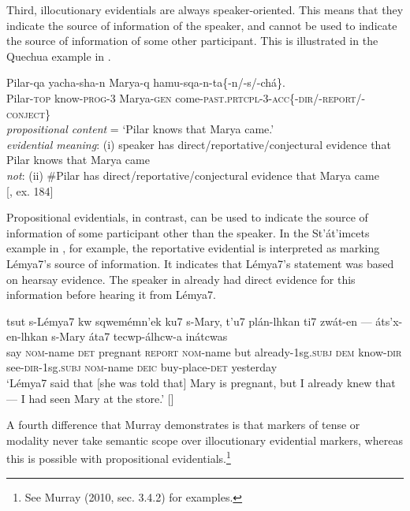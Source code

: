 Third, illocutionary evidentials are always speaker-oriented. This means that they indicate the source of information of the speaker, and cannot be used to indicate the source of information of some other participant. This is illustrated in the Quechua example in .


\ea
\gll Pilar-qa  yacha-sha-n  Marya-q  hamu-sqa-n-ta\{-n/-s/-chá\}.\\
Pilar-\textsc{top}  know-\textsc{prog}-3  Marya-\textsc{gen}  come-\textsc{past.prtcpl}-3-\textsc{acc\{-dir}/-\textsc{report}/-\textsc{conject\}}\\
\glt \textit{propositional content} = ‘Pilar knows that Marya came.’\\
\textit{evidential meaning}: (i) speaker has direct/reportative/conjectural evidence that\\
    Pilar knows that Marya came\\
\textit{not}: (ii) \#Pilar has direct/reportative/conjectural evidence that Marya came\\
     {}[\citealt{Faller2002}, ex. 184]
\z


Propositional evidentials, in contrast, can be used to indicate the source of information of some participant other than the speaker. In the St’át’imcets example in , for example, the reportative evidential is interpreted as marking Lémya7’s source of information. It indicates that Lémya7’s statement was based on hearsay evidence. The speaker in  already had direct evidence for this information before hearing it from Lémya7.


\ea
\gll tsut  s-Lémya7  kw  sqwemémn’ek  ku7  s-Mary,  t’u7  plán-lhkan ti7  zwát-en  —  áts’x-en-lhkan  s-Mary  áta7  tecwp-álhcw-a  inátcwas\\
say  \textsc{nom}-name  \textsc{det}  pregnant  \textsc{report  nom}-name  but  already-1sg.\textsc{subj} \textsc{dem}  know-\textsc{dir}    see-\textsc{dir}-1sg.\textsc{subj}  \textsc{nom}-name  \textsc{deic}  buy-place-\textsc{det}  yesterday\\
\glt ‘Lémya7 said that [she was told that] Mary is pregnant, but I already knew that — I had seen Mary at the store.’   [\citealt{MatthewsonEtAl2007}]
\z

A fourth difference that Murray demonstrates is that markers of tense or modality never take semantic scope over illocutionary evidential markers, whereas this is possible with propositional evidentials.\footnote{See Murray (2010, sec. 3.4.2) for examples.}



